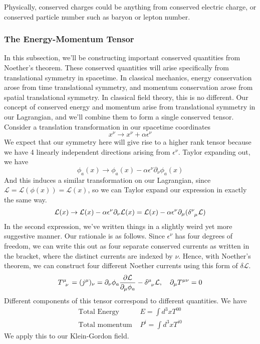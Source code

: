 Physically, conserved charges could be anything from conserved electric charge, or conserved particle number such as baryon or lepton number. 
\subsubsection{The Energy-Momentum Tensor} 
In this subsection, we'll be constructing important conserved quantities from Noether's theorem. These conserved quantities will arise specifically from translational symmetry in spacetime. In classical mechanics, energy conservation arose from time translational symmetry, and momentum conservation arose from spatial translational symmetry. In classical field theory, this is no different. Our concept of conserved energy and momentum arise from translational symmetry in our Lagrangian, and we'll combine them to form a single conserved tensor. 
Consider a translation transformation in our spacetime coordinates 
\[
x^\nu \rightarrow x^\nu + \alpha \epsilon^\nu 
\]
We expect that our symmetry here will give rise to a higher rank tensor because we have 4 linearly independent directions arising from $\epsilon^\nu$. Taylor expanding out, we have 
\[
\phi_a(x) \rightarrow \phi_a(x) - \alpha \epsilon^\nu\partial_\nu \phi_a(x)
\]
And this induces a similar transformation on our Lagrangian, since $\mathcal{L} = \mathcal{L} (\phi ( x))  = \mathcal{L}( x)$, so we can Taylor expand our expression in exactly the same way. 
\[ 
\Lagr(x) \rightarrow \Lagr(x)  - \alpha \epsilon^\nu\partial_\nu \Lagr(x) = \Lagr(x) - \alpha \epsilon^\nu \partial_\mu (\delta\indices{^\nu_\mu}\mathcal{L} ) 
\]
In the second expression, we've written things in a slightly weird yet more suggestive manner. Our rationale is as follows. Since $\epsilon^\nu$ has four degrees of freedom, we can write this out as four separate conserved currents as written in the bracket, where the distinct currents are indexed by $\nu$. 
Hence, with Noether's theorem, we can construct four different Noether currents using this form of $\delta \mathcal{L}$. 
\[ 
T\indices{^\mu_\nu} = (j^\mu)_\nu = \partial_\nu \phi_a \frac{ \partial \Lagr }{ \partial_\mu \phi_a}  - \delta\indices{^\mu_\nu}\mathcal{L} , \quad \partial_\mu T^{\mu \nu} = 0 
\] 
Different components of this tensor correspond to different quantities. We have 
\begin{align*} 
\text{Total Energy } & E = \int d^ 3 x T^{ 00} \\
\text{Total momentum } & P^i = \int d^3 x T^{ i0 } 
\end{align*} 
We apply this to our Klein-Gordon field. 
